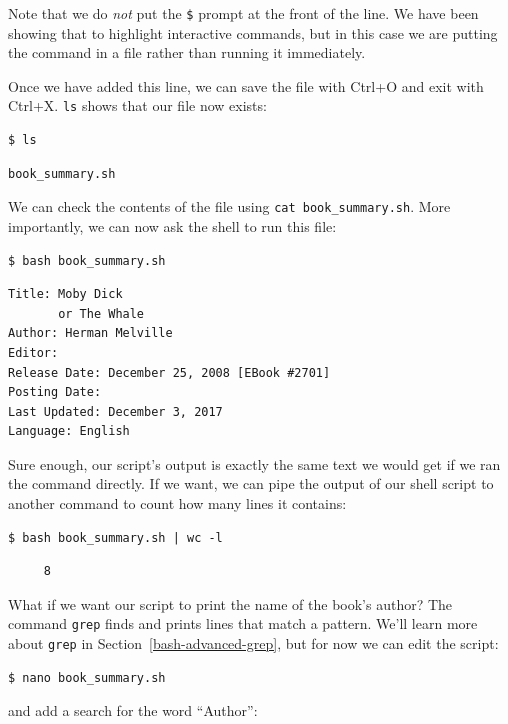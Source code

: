 \documentclass[
]{krantz}
\begin{document}
Note that we do \emph{not} put the \texttt{\$} prompt at the front of the line.
We have been showing that to highlight interactive commands,
but in this case we are putting the command in a file rather than running it immediately.

Once we have added this line,
we can save the file with Ctrl+O
and exit with Ctrl+X.
\texttt{ls} shows that our file now exists:

\begin{verbatim}
$ ls
\end{verbatim}

\begin{verbatim}
book_summary.sh
\end{verbatim}

We can check the contents of the file using \texttt{cat\ book\_summary.sh}.
More importantly,
we can now ask the shell to run this file:

\begin{verbatim}
$ bash book_summary.sh
\end{verbatim}

\begin{verbatim}
Title: Moby Dick
       or The Whale
Author: Herman Melville
Editor:
Release Date: December 25, 2008 [EBook #2701]
Posting Date:
Last Updated: December 3, 2017
Language: English
\end{verbatim}

Sure enough,
our script's output is exactly the same text we would get if we ran the command directly.
If we want,
we can pipe the output of our shell script to another command to count how many lines it contains:

\begin{verbatim}
$ bash book_summary.sh | wc -l
\end{verbatim}

\begin{verbatim}
     8
\end{verbatim}

What if we want our script to print the name of the book's author?
The command \texttt{grep} finds and prints lines that match a pattern.
We'll learn more about \texttt{grep} in Section~\ref{bash-advanced-grep},
but for now we can edit the script:

\begin{verbatim}
$ nano book_summary.sh
\end{verbatim}

and add a search for the word ``Author'':
\end{document}
